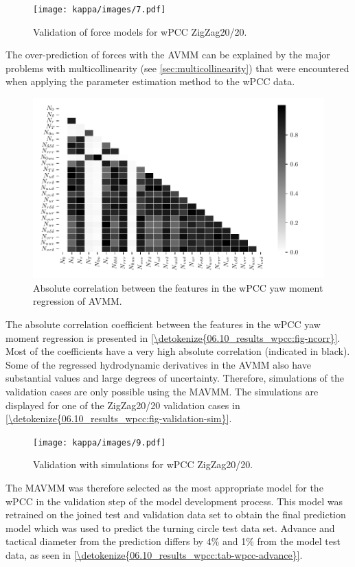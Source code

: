\begin{figure}[h!]
\centering
\texttt{[image: kappa/images/7.pdf]}
\caption{Validation of force models for wPCC ZigZag20/20.}\label{fig:validation-forces}
\end{figure}
\noindent The over-prediction of forces with the AVMM can be explained by the major problems with multicollinearity (see \autoref{sec:multicollinearity}) that were encountered when applying the parameter estimation method to the wPCC data.
\begin{figure}[ht!]
\centering
\includegraphics[width=1.0\textwidth]{kappa/images/10.pdf}
\caption{Absolute correlation between the features in the wPCC yaw moment regression of AVMM.}\label{\detokenize{06.10_results_wpcc:fig-ncorr}}
\end{figure}
\clearpage
The absolute correlation coefficient between the features in the wPCC yaw moment regression is presented in \hyperref[\detokenize{06.10_results_wpcc:fig-ncorr}]{\autoref{\detokenize{06.10_results_wpcc:fig-ncorr}}}. Most of the coefficients have a very high absolute correlation (indicated in black). Some of the regressed hydrodynamic derivatives in the AVMM also have substantial values and large degrees of uncertainty. Therefore, simulations of the validation cases are only possible using the MAVMM. The simulations are displayed for one of the ZigZag20/20 validation cases in \hyperref[\detokenize{06.10_results_wpcc:fig-validation-sim}]{\autoref{\detokenize{06.10_results_wpcc:fig-validation-sim}}}.
\begin{figure}[h!]
\centering
\texttt{[image: kappa/images/9.pdf]}
\caption{Validation with simulations for wPCC ZigZag20/20.}\label{\detokenize{06.10_results_wpcc:fig-validation-sim}}\end{figure}
The MAVMM was therefore selected as the most appropriate model for the wPCC in the validation step of the model development process. This model was retrained on the joined test and validation data set to obtain the final prediction model which was used to predict the turning circle test data set. Advance and tactical diameter \cite{imoStandardsShipManoeuvrability2002} from the prediction differs by 4\% and 1\% from the model test data, as seen in \autoref{\detokenize{06.10_results_wpcc:tab-wpcc-advance}}.
